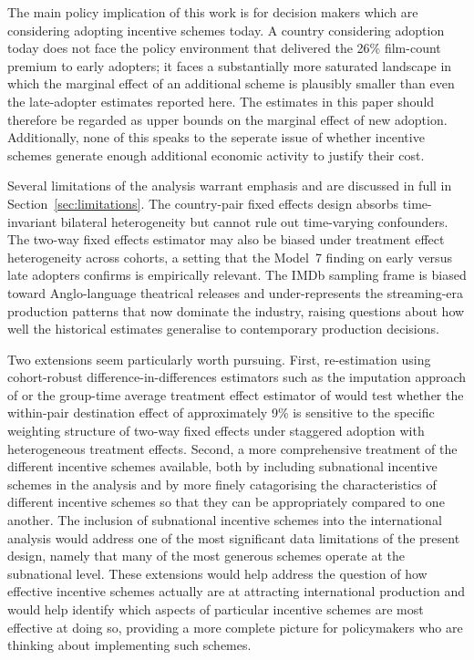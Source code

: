 The main policy implication of this work is for decision makers which are  considering adopting incentive schemes today. A country considering adoption today does not face the policy environment that delivered the 26\% film-count premium to early adopters; it faces a substantially more saturated landscape in which the marginal effect of an additional scheme is plausibly smaller than even the late-adopter estimates reported here. The estimates in this paper should therefore be regarded as upper bounds on the marginal effect of new adoption. Additionally, none of this speaks to the seperate issue of whether incentive schemes generate enough additional economic activity to justify their cost.

Several limitations of the analysis warrant emphasis and are discussed in full in Section~\ref{sec:limitations}. The country-pair fixed effects design absorbs time-invariant bilateral heterogeneity but cannot rule out time-varying confounders. The two-way fixed effects estimator may also be biased under treatment effect heterogeneity across cohorts, a setting that the Model~7 finding on early versus late adopters confirms is empirically relevant. The IMDb sampling frame is biased toward Anglo-language theatrical releases and  under-represents the streaming-era production patterns that now dominate the industry, raising questions about how well the historical estimates generalise to contemporary production decisions.

Two extensions seem particularly worth pursuing. First, re-estimation using cohort-robust difference-in-differences estimators such as the imputation approach of \citet{borusyak2024} or the group-time average treatment effect estimator of \citet{callaway2021} would test whether the within-pair destination effect of approximately 9\% is sensitive to the specific weighting structure of two-way fixed effects under staggered adoption with heterogeneous treatment effects. Second, a more comprehensive treatment of the different incentive schemes available, both by including subnational incentive schemes in the analysis and by more finely catagorising the characteristics of different incentive schemes so that they can be appropriately compared to one another. The inclusion of subnational incentive schemes into the international analysis would address one of the most significant data limitations of the present design, namely that many of the most generous schemes operate at the subnational level. These extensions would help address the question of how effective incentive schemes actually are at attracting international production and would help identify which aspects of particular incentive schemes are most effective at doing so, providing a more complete picture for policymakers who are thinking about implementing such schemes.
